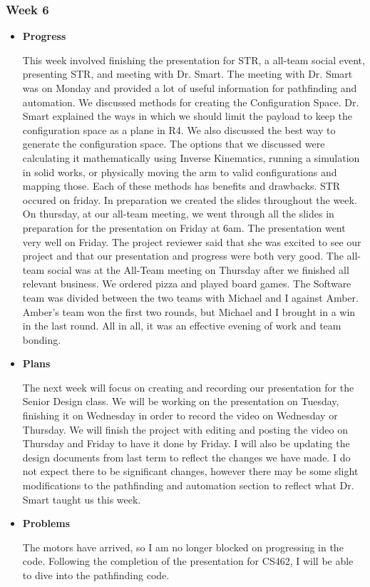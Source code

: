 \subsubsection{Week 6}
\begin{itemize}
\item{
\textbf{Progress}

This week involved finishing the presentation for STR, a all-team social event, presenting STR, and meeting with Dr. Smart. The meeting with Dr. Smart was on Monday and provided a lot of useful information for pathfinding and automation. We discussed methods for creating the Configuration Space. Dr. Smart explained the ways in which we should limit the payload to keep the configuration space as a plane in R4. We also discussed the best way to generate the configuration space. The options that we discussed were calculating it mathematically using Inverse Kinematics, running a simulation in solid works, or physically moving the arm to valid configurations and mapping those. Each of these methods has benefits and drawbacks. STR occured on friday. In preparation we created the slides throughout the week. On thursday, at our all-team meeting, we went through all the slides in preparation for the presentation on Friday at 6am. The presentation went very well on Friday. The project reviewer said that she was excited to see our project and that our presentation and progress were both very good. The all-team social was at the All-Team meeting on Thursday after we finished all relevant business. We ordered pizza and played board games. The Software team was divided between the two teams with Michael and I against Amber. Amber's team won the first two rounds, but Michael and I brought in a win in the last round. All in all, it was an effective evening of work and team bonding.
}
\item{
\textbf{Plans}

The next week will focus on creating and recording our presentation for the Senior Design class. We will be working on the presentation on Tuesday, finishing it on Wednesday in order to record the video on Wednesday or Thursday. We will finish the project with editing and posting the video on Thursday and Friday to have it done by Friday. I will also be updating the design documents from last term to reflect the changes we have made. I do not expect there to be significant changes, however there may be some slight modifications to the pathfinding and automation section to reflect what Dr. Smart taught us this week.
}
\item{
\textbf{Problems}

The motors have arrived, so I am no longer blocked on progressing in the code. Following the completion of the presentation for CS462, I will be able to dive into the pathfinding code.
}
\end{itemize}

